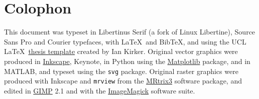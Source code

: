 \documentclass[12pt,phd,a4paper,oneside,draft]{ucl_thesis}
\begin{document}
\printbibliography

\chapter*{Colophon}

This document was typeset in Libertinus Serif (a fork of Linux Libertine), {\sffamily Source Sans Pro} and {\ttfamily Courier} typefaces, with \LaTeX\ and Bib\TeX, and using the UCL \LaTeX\ \href{https://github.com/UCL/ucl-latex-thesis-templates}{thesis template} created by Ian Kirker.
Original vector graphics were produced in \href{https://inkscape.org/}{Inkscape}, Keynote, in Python using the \href{https://matplotlib.org/}{Matplotlib} package, and in MATLAB, and typeset using the \verb|svg| package.
Original raster graphics were produced with Inkscape and \verb|mrview| from the \href{https://www.mrtrix.org/}{MRtrix3} software package, and edited in \href{https://www.gimp.org/}{GIMP} 2.1 and with the \href{https://imagemagick.org/index.php}{ImageMagick} software suite.

\end{document}
